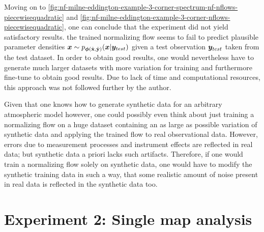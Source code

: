\documentclass[a4paper,11pt]{report}
\def\fc#1{{\color{black}{#1}}} %
\def\lk#1{{\color{black}{#1}}}
\begin{document}
Moving on to \cref{fig:nf-milne-eddington-example-3-corner-spectrum-nf-nflows-piecewisequadratic} and \cref{fig:nf-milne-eddington-example-3-corner-nflows-piecewisequadratic}, one can conclude that the experiment did not yield satisfactory results. \lk{This is to say that} the trained normalizing flow seems to fail to predict plausible parameter densities $\bm{x} \sim p_{\bm{\phi}(\hat{\boldsymbol{\mathbf{x}}}, \hat{\boldsymbol{\mathbf{y}}})}(\bm{x}|\bm{y}_{test})$ given a test observation $\bm{y}_{test}$ taken from the test dataset. \fc{However, provided one has knowledge of how general probability densities for atmospheric parameters in the solar atmosphere roughly look like, such that one could generate a synthetic dataset of similar variation, the approach with training and testing on synthetic data could still have merit, given that enough time and computational power are at disposal.} In order to obtain good results, one would nevertheless have to generate much larger datasets with more variation for training and furthermore fine-tune \lk{the hyperparameters in order} to obtain good results. Due to lack of time and computational resources, this approach was not followed further by the author. 

Given that one knows how to generate synthetic data for an arbitrary atmospheric model however, one could possibly even think about just training a normalizing flow on a huge dataset containing an as large as possible variation of synthetic data and applying the trained flow to real observational data. \fc{Compared to a training dataset only consisting of real observational data, the approach with purely synthetic data would have the advantage that one could generate as much variance as desired in the training data samples.} However, errors due to measurement processes and instrument effects are reflected in real data; but synthetic data a priori lacks such artifacts. Therefore, if one would train a normalizing flow solely on synthetic data, one would have to modify the synthetic training data in such a way, that some realistic amount of noise present in real data is reflected in the synthetic data too.

\section{Experiment 2: Single map analysis}
\end{document}
